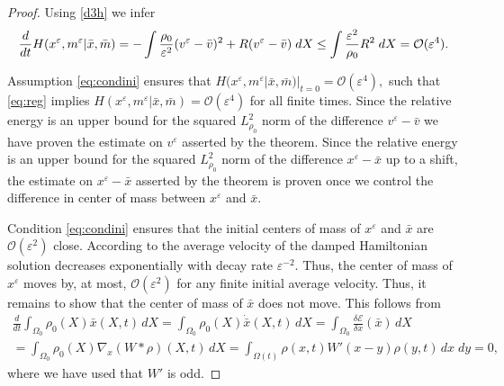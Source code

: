 \documentclass[10pt, letterpaper]{article}
\def\E{{\mathcal{E}}}
\def\bx{\bar{x}}
\def\eps{\varepsilon}
\theoremstyle{definition}
\theoremstyle{remark}
\begin{document}
\begin{proof}
Using \eqref{d3h} we infer
 \begin{equation}\label{eq:reg}
  \frac{d}{dt} H(x^\eps, m^\eps| \bar{x}, \bar{m })  =  - \int \frac{\rho_0}{\eps^2} (v^\eps - \bar v)^2 + R( {v}^\eps-\bar{ {v}})\; dX \\
  \leq \int \frac{\eps^2}{\rho_0} R^2 \; dX = \mathcal{O}(\eps^4).
 \end{equation}
 
 Assumption \eqref{eq:condini} ensures that $H(x^\eps, m^\eps| \bar{x}, \bar{m })|_{t=0} =\mathcal{O}(\eps^4),$
 such that \eqref{eq:reg} implies $H(x^\eps, m^\eps| \bar{x}, \bar{m })= \mathcal{O}(\eps^4)$ for all finite times.
  Since the relative energy is an upper bound for the squared $L^2_{\rho_0}$ norm of the difference $v^\eps - \bar v$ we have proven  the estimate on $v^\eps$ asserted by the theorem.
 Since the relative energy is an upper bound for the squared $L^2_{\rho_0}$ norm of the difference $x^\eps - \bx$ up to a shift, the estimate on $x^\eps- \bx$ asserted by the theorem is proven once we
 control the difference in center of mass between $x^\eps$ and $\bar x.$
 
 Condition \eqref{eq:condini} ensures that the initial centers of mass of $x^\eps$ and $\bar x$ are $\mathcal{O}(\eps^2)$ close.
 According to \cite[eq. (2.3)]{CCZ} the average velocity of the damped Hamiltonian solution decreases exponentially with decay rate $\eps^{-2}$. Thus,  the center of mass of $x^\eps$
 moves by, at most, $\mathcal{O}(\eps^2)$ for any finite initial average velocity.
 Thus, it remains to show that the center of mass of $\bar x$ does not move. 
 This follows from
 \begin{multline}
  \frac{d}{dt} \int_{\Omega_0} \rho_0(X) \bx(X,t) \, dX = \int_{\Omega_0} \rho_0(X) \dot{\bx}(X,t) \, dX = \int_{\Omega_0} \frac{\delta \E}{\delta x}(\bar x) \, dX
  \\
  = \int_{\Omega_0} \rho_0(X) \nabla_x (W * \rho) (X,t) \, dX
  =  \int_{\Omega(t)} \rho(x,t) W'(x-y) \rho(y,t)\, dx\; dy =0,
 \end{multline}
where we have used that $W'$ is odd.
 

 \end{proof}
\end{document}
